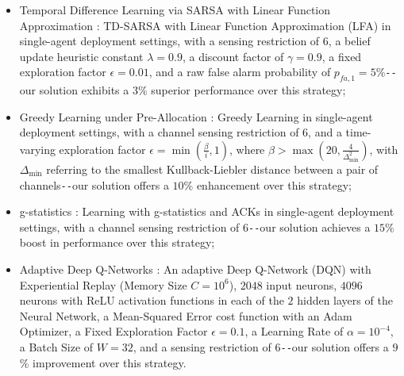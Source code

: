 \documentclass[12pt, draftcls, onecolumn]{IEEEtran}
\begin{document}
\begin{itemize}
    \item Temporal Difference Learning via SARSA with Linear Function Approximation \cite{WCL:5}: TD-SARSA with Linear Function Approximation (LFA) in single-agent deployment settings, with a sensing restriction of $6$, a belief update heuristic constant $\lambda{=}0.9$, a discount factor of $\gamma{=}0.9$, a fixed exploration factor $\epsilon{=}0.01$, and a raw false alarm probability of $p_{fa,1}{=}5$\%\texttt{-{}-}our solution exhibits a $3$\% superior performance over this strategy;
    \item Greedy Learning under Pre-Allocation \cite{WCL:MIT}: Greedy Learning in single-agent deployment settings, with a channel sensing restriction of $6$, and a time-varying exploration factor $\epsilon{=}\min(\frac{\beta}{i}, 1)$, where $\beta{>}\max(20, \frac{4}{\Delta_{\text{min}}^{2}})$, with $\Delta_{\text{min}}$ referring to the smallest Kullback-Liebler distance between a pair of channels\texttt{-{}-}our solution offers a $10$\% enhancement over this strategy;
    \item g-statistics \cite{WCL:MIT}: Learning with g-statistics and ACKs in single-agent deployment settings, with a channel sensing restriction of $6$\texttt{-{}-}our solution achieves a $15$\% boost in performance over this strategy;
    \item Adaptive Deep Q-Networks \cite{WCL:DQN}: An adaptive Deep Q-Network (DQN) with Experiential Replay (Memory Size $C{=}10^{6}$), $2048$ input neurons, $4096$ neurons with ReLU activation functions in each of the $2$ hidden layers of the Neural Network, a Mean-Squared Error cost function with an Adam Optimizer, a Fixed Exploration Factor $\epsilon{=}0.1$, a Learning Rate of $\alpha{=}10^{-4}$, a Batch Size of $W{=}32$, and a sensing restriction of $6$\texttt{-{}-}our solution offers a $9$\% improvement over this strategy.
\end{itemize}
\end{document}
